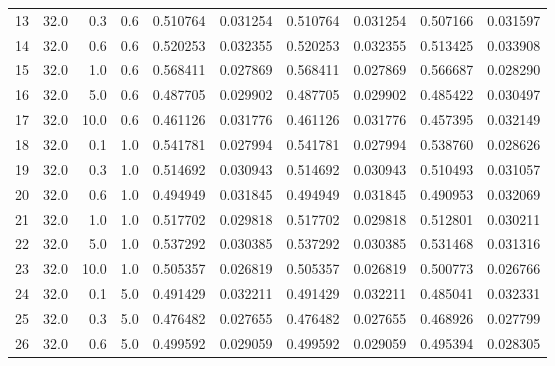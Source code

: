 \begin{tabular}{lrrrrrrrrr}
13 &            32.0 &   0.3 &   0.6 &         0.510764 &        0.031254 &         0.510764 &        0.031254 &         0.507166 &        0.031597 \\
14 &            32.0 &   0.6 &   0.6 &         0.520253 &        0.032355 &         0.520253 &        0.032355 &         0.513425 &        0.033908 \\
15 &            32.0 &   1.0 &   0.6 &         0.568411 &        0.027869 &         0.568411 &        0.027869 &         0.566687 &        0.028290 \\
16 &            32.0 &   5.0 &   0.6 &         0.487705 &        0.029902 &         0.487705 &        0.029902 &         0.485422 &        0.030497 \\
17 &            32.0 &  10.0 &   0.6 &         0.461126 &        0.031776 &         0.461126 &        0.031776 &         0.457395 &        0.032149 \\
18 &            32.0 &   0.1 &   1.0 &         0.541781 &        0.027994 &         0.541781 &        0.027994 &         0.538760 &        0.028626 \\
19 &            32.0 &   0.3 &   1.0 &         0.514692 &        0.030943 &         0.514692 &        0.030943 &         0.510493 &        0.031057 \\
20 &            32.0 &   0.6 &   1.0 &         0.494949 &        0.031845 &         0.494949 &        0.031845 &         0.490953 &        0.032069 \\
21 &            32.0 &   1.0 &   1.0 &         0.517702 &        0.029818 &         0.517702 &        0.029818 &         0.512801 &        0.030211 \\
22 &            32.0 &   5.0 &   1.0 &         0.537292 &        0.030385 &         0.537292 &        0.030385 &         0.531468 &        0.031316 \\
23 &            32.0 &  10.0 &   1.0 &         0.505357 &        0.026819 &         0.505357 &        0.026819 &         0.500773 &        0.026766 \\
24 &            32.0 &   0.1 &   5.0 &         0.491429 &        0.032211 &         0.491429 &        0.032211 &         0.485041 &        0.032331 \\
25 &            32.0 &   0.3 &   5.0 &         0.476482 &        0.027655 &         0.476482 &        0.027655 &         0.468926 &        0.027799 \\
26 &            32.0 &   0.6 &   5.0 &         0.499592 &        0.029059 &         0.499592 &        0.029059 &         0.495394 &        0.028305 \\

\end{tabular}
